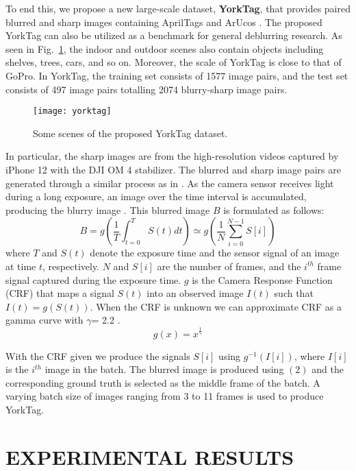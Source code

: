 \documentclass[letterpaper, 10 pt, conference]{ieeeconf}
\begin{document}
To end this, we propose a new large-scale dataset, \textbf{YorkTag}, that provides paired blurred and sharp images containing AprilTags \cite{ap3} and ArUcos \cite{aruco}. The proposed YorkTag can also be utilized as a benchmark for general deblurring research. As seen in Fig.~\ref{yorktag}, the indoor and outdoor scenes also contain objects including shelves, trees, cars, and so on. Moreover, the scale of YorkTag is close to that of GoPro. In YorkTag, the training set consists of 1577 image pairs, and the test set consists of 497 image pairs totalling 2074 blurry-sharp image pairs. 
\begin{figure}[thpb]
	\centering
	\texttt{[image: yorktag]}
	\caption{Some scenes of the proposed YorkTag dataset.}
	\label{yorktag}
\end{figure}

In particular, the sharp images are from the high-resolution videos captured by iPhone 12 with the DJI OM 4 stabilizer. The blurred and sharp image pairs are generated through a similar process as in \cite{nah}. As the camera sensor receives light during a long exposure, an image over the time interval is accumulated, producing the blurry image \cite{blurgen}. This blurred image $B$ is formulated as follows:\begin{equation} 
	B=g\left(\dfrac{1}{T}\int^{T}_{t=0} S(t) dt\right) \simeq g\left(\dfrac{1}{N}\sum^{N-1}_{i=0} S[i]\right) 
\end{equation}
where $T$ and $S(t)$  denote the exposure time and the sensor signal of an image at time $t$, respectively. $N$ and $S[i]$ are the number of frames, and the $i^{th}$ frame signal captured during the exposure time. $g$ is the Camera Response Function  (CRF) that maps a signal $S(t)$ into an observed image $I(t)$ such that $I(t) = g(S(t))$. When the CRF is unknown we can approximate CRF as a gamma curve with $\gamma$= 2.2 \cite{CRF}.\begin{equation} g(x)= x^{\frac{1}{\gamma}}\end{equation}

With the CRF given we produce the signals $S[i]$ using $g^{-1}\left(I[i]\right)$, where $I[i]$ is the $i^{th}$ image in the batch. The blurred image is produced using $(2)$ and the corresponding ground truth is selected as the middle frame of the batch. A varying batch size of images ranging from 3 to 11 frames is used to produce YorkTag.



\section{EXPERIMENTAL RESULTS}\label{exp}
\end{document}
